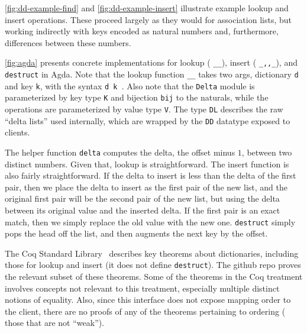 

\autoref{fig:dd-example-find} and \autoref{fig:dd-example-insert} illustrate example lookup and insert operations.
%
These proceed largely as they would for association lists, but working indirectly with keys encoded as natural numbers and, furthermore, differences between these numbers.

\autoref{fig:agda} presents concrete implementations for lookup (\ie{} \texttt{\_\altLAng\_\altRAng}), insert (\ie{} \texttt{\_,,\_}), and \texttt{destruct} in Agda.
%
Note that the lookup function \texttt{\_\altLAng\_\altRAng} takes two args, dictionary \texttt{d} and key \texttt{k}, with the syntax \texttt{d \altLAng{} k \altRAng}.
%
Also note that the \texttt{Delta} module is parameterized by key type \verb+K+ and bijection \verb+bij+ to the naturals, while the operations are parameterized by value type \verb+V+.
%
%
The type \verb+DL+ describes the raw ``delta lists'' used internally, which are wrapped by the \verb+DD+ datatype exposed to clients.

The helper function \verb+delta+ computes the delta, \ie{} the offset minus $1$, between two distinct numbers.
%
Given that, lookup is straightforward. The insert function is also fairly straightforward.
%
If the delta to insert is less than the delta of the first pair, then we place the delta to insert as the first pair of the new list, and
%
the original first pair will be the second pair of the new list, but using the delta between its original value and the inserted delta.
%
If the first pair is an exact match, then we simply replace the old value with the new one.
%
\verb+destruct+ simply pops the head off the list, and then augments the next key by the offset.

%
The Coq Standard Library~\citep{FMapInterface,FMapFacts} describes key theorems about dictionaries, including those for lookup and insert (it does not define \verb+destruct+).
%
The github repo \citep{github:agda} proves the relevant subset of these theorems. Some of the theorems in the Coq treatment involves concepts not relevant to this treatment,
%
especially multiple distinct notions of equality. Also, since this interface does not expose mapping order to the client,
%
there are no proofs of any of the theorems pertaining to ordering (\ie{} those that are not ``weak'').


